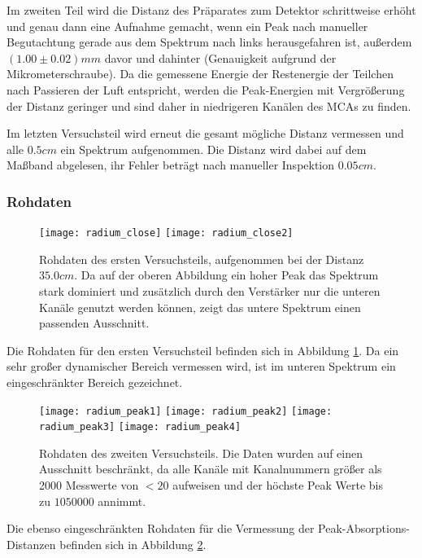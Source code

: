 \documentclass{../Misc/MontavonLaTeX/Montavon}
\newcommand{\halfwidth}{0.48\textwidth}
\newcommand{\fullwidth}{1.0\textwidth}
\begin{document}
Im zweiten Teil wird die Distanz des Präparates zum Detektor schrittweise erhöht und genau dann eine Aufnahme gemacht, wenn ein Peak nach manueller Begutachtung gerade aus dem Spektrum nach links herausgefahren ist, außerdem $(1.00 \pm 0.02) \unit{mm}$ davor und dahinter (Genauigkeit aufgrund der Mikrometerschraube). Da die gemessene Energie der Restenergie der Teilchen nach Passieren der Luft entspricht, werden die Peak-Energien mit Vergrößerung der Distanz geringer und sind daher in niedrigeren Kanälen des MCAs zu finden.

Im letzten Versuchsteil wird erneut die gesamt mögliche Distanz vermessen und alle $0.5 \unit{cm}$ ein Spektrum aufgenommen. Die Distanz wird dabei auf dem Maßband abgelesen, ihr Fehler beträgt nach manueller Inspektion $0.05 \unit{cm}$.

\subsubsection{Rohdaten}

\begin{figure}[htbp]
\centering
\texttt{[image: radium\_close]}
\texttt{[image: radium\_close2]}
\caption{Rohdaten des ersten Versuchsteils, aufgenommen bei der Distanz $35.0 \unit{cm}$. Da auf der oberen Abbildung ein hoher Peak das Spektrum stark dominiert und zusätzlich durch den Verstärker nur die unteren Kanäle genutzt werden können, zeigt das untere Spektrum einen passenden Ausschnitt.}
\label{fig:radium_close}
\end{figure}

Die Rohdaten für den ersten Versuchsteil befinden sich in Abbildung \ref{fig:radium_close}. Da ein sehr großer dynamischer Bereich vermessen wird, ist im unteren Spektrum ein eingeschränkter Bereich gezeichnet.

\begin{figure}[htbp]
\centering
\texttt{[image: radium\_peak1]}
\texttt{[image: radium\_peak2]}
\texttt{[image: radium\_peak3]}
\texttt{[image: radium\_peak4]}
\caption{Rohdaten des zweiten Versuchsteils. Die Daten wurden auf einen Ausschnitt beschränkt, da alle Kanäle mit Kanalnummern größer als 2000 Messwerte von $< 20$ aufweisen und der höchste Peak Werte bis zu $1050000$ annimmt.}
\label{fig:radium_peaks}
\end{figure}

Die ebenso eingeschränkten Rohdaten für die Vermessung der Peak-Absorptions-Distanzen befinden sich in Abbildung \ref{fig:radium_peaks}.
\end{document}
